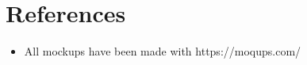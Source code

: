 \chapter{References}
\begin{itemize}
    \item All mockups have been made with https://moqups.com/
\end{itemize}
